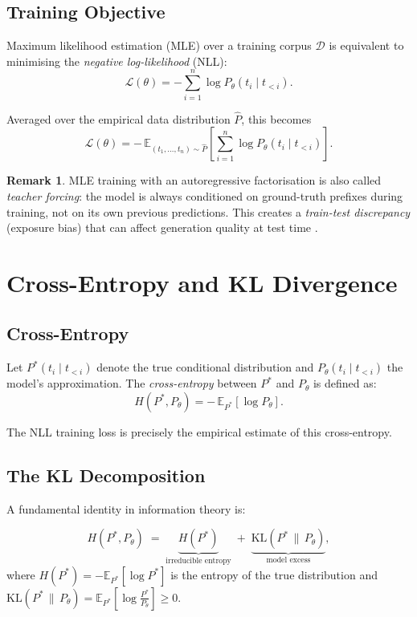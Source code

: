 \documentclass[11pt,a4paper]{article}
\theoremstyle{definition}
\newtheorem{remark}{Remark}[section]
\theoremstyle{plain}
\newcommand{\E}{\mathbb{E}}
\newcommand{\KL}[2]{\mathrm{KL}\!\left(#1\,\|\,#2\right)}
\newcommand{\Hc}{H}
\newcommand{\tloss}{\mathcal{L}}
\begin{document}
\subsection{Training Objective}

Maximum likelihood estimation (MLE) over a training corpus $\mathcal{D}$
is equivalent to minimising the \emph{negative log-likelihood} (NLL):
\[
  \tloss(\theta)
  = -\sum_{i=1}^{n} \log P_\theta(t_i \mid t_{<i}).
\]

Averaged over the empirical data distribution $\hat{P}$, this becomes
\[
  \tloss(\theta)
  = -\,\E_{(t_1,\dots,t_n)\sim \hat{P}}
    \!\left[\sum_{i=1}^{n} \log P_\theta(t_i \mid t_{<i})\right].
\]

\begin{remark}
  MLE training with an autoregressive factorisation is also called
  \emph{teacher forcing}: the model is always conditioned on ground-truth
  prefixes during training, not on its own previous predictions.
  This creates a \emph{train-test discrepancy} (exposure bias) that can
  affect generation quality at test time \cite{bengio2015scheduled}.
\end{remark}

\section{Cross-Entropy and KL Divergence}

\subsection{Cross-Entropy}

Let $P^*(t_i \mid t_{<i})$ denote the true conditional distribution and
$P_\theta(t_i \mid t_{<i})$ the model's approximation.
The \emph{cross-entropy} between $P^*$ and $P_\theta$ is defined as:
\[
  \Hc(P^*, P_\theta)
  = -\,\E_{P^*}\!\left[\log P_\theta\right].
\]

The NLL training loss is precisely the empirical estimate of this cross-entropy.

\subsection{The KL Decomposition}

A fundamental identity in information theory is:

\begin{keyresult}
\[
  \Hc(P^*, P_\theta)
  \;=\;
  \underbrace{\Hc(P^*)}_{\text{irreducible entropy}}
  \;+\;
  \underbrace{\KL{P^*}{P_\theta}}_{\text{model excess}},
\]
where $\Hc(P^*) = -\E_{P^*}[\log P^*]$ is the entropy of the true distribution
and $\KL{P^*}{P_\theta} = \E_{P^*}\!\left[\log \frac{P^*}{P_\theta}\right] \geq 0$.
\end{keyresult}
\end{document}
